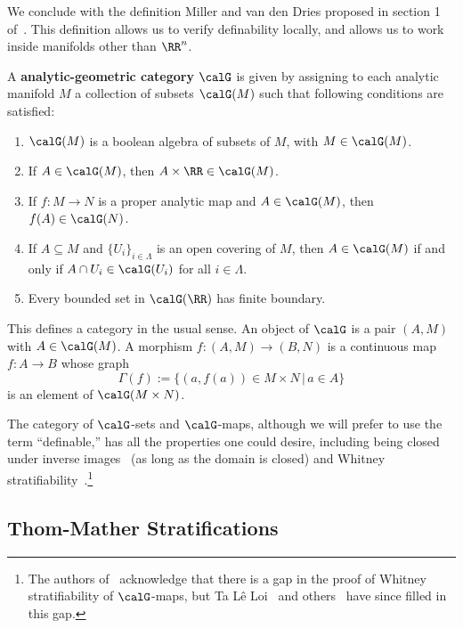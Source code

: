 We conclude with the definition Miller and van den Dries proposed in section 1 of~\cite{vdd-geocat}. This definition allows us to verify definability locally, and allows us to work inside manifolds other than $\RR^n$.

\begin{defn}
	A \textbf{analytic-geometric category} $\calG$ is given by assigning to each analytic manifold $M$ a collection of subsets $\calG(M)$ such that following conditions are satisfied:
	\begin{enumerate}
		\item $\calG(M)$ is a boolean algebra of subsets of $M$, with $M\in\calG(M)$.
		\item If $A\in\calG(M)$, then $A\times\RR\in\calG(M)$.
		\item If $f:M\to N$ is a proper analytic map and $A\in\calG(M)$, then $f(A)\in\calG(N)$.
		\item If $A\subseteq M$ and $\{U_i\}_{i\in\Lambda}$ is an open covering of $M$, then $A\in\calG(M)$ if and only if $A\cap U_i\in\calG(U_i)$ for all $i\in\Lambda$.
		\item Every bounded set in $\calG(\RR)$ has finite boundary.
	\end{enumerate}
\end{defn}
\begin{rmk}
This defines a category in the usual sense. An object of $\calG$ is a pair $(A,M)$ with $A\in\calG(M)$. A morphism $f:(A,M)\to (B,N)$ is a continuous map $f:A\to B$ whose graph
\[
	\Gamma(f):=\{(a,f(a))\in M\times N\,|\, a\in A\}
\]
is an element of $\calG(M\times N)$.
\end{rmk}

The category of $\calG$-sets and $\calG$-maps, although we will prefer to use the term ``definable,'' has all the properties one could desire, including being closed under inverse images~\cite[D.7]{vdd-geocat} (as long as the domain is closed) and Whitney stratifiability~\cite[D.16]{vdd-geocat}.\footnote{The authors of~\cite{vdd-geocat} acknowledge that there is a gap in the proof of Whitney stratifiability of $\calG$-maps, but Ta L\^{e} Loi~\cite{loi-omin} and others~\cite{definably-stratified} have since filled in this gap.}


\subsection{Thom-Mather Stratifications}

